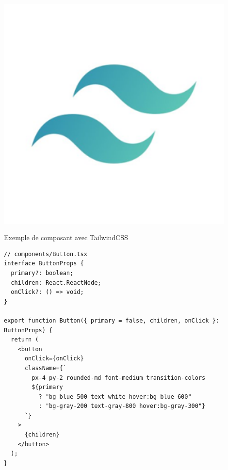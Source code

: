 \begin{minipage}{0.25\textwidth}
\centering
\includegraphics[width=0.9\textwidth]{assets/docs/logo_tailwindcss.png}
\end{minipage}

\begin{codebox}{Exemple de composant avec TailwindCSS}
\begin{lstlisting}
// components/Button.tsx
interface ButtonProps {
  primary?: boolean;
  children: React.ReactNode;
  onClick?: () => void;
}

export function Button({ primary = false, children, onClick }: ButtonProps) {
  return (
    <button
      onClick={onClick}
      className={`
        px-4 py-2 rounded-md font-medium transition-colors
        ${primary 
          ? "bg-blue-500 text-white hover:bg-blue-600" 
          : "bg-gray-200 text-gray-800 hover:bg-gray-300"}
      `}
    >
      {children}
    </button>
  );
}
\end{lstlisting}
\end{codebox}

